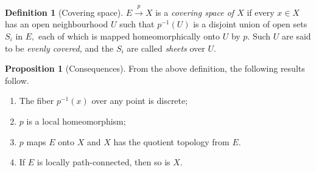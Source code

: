 \documentclass[12pt]{article}
\theoremstyle{definition}
\numberwithin{thm}{section}
\newtheorem{defn}[thm]{Definition}
\newtheorem{prop}[thm]{Proposition}
\begin{document}
\begin{defn}[Covering space]
	$E \overset{p}{\longrightarrow} X$ is a \emph{covering space of $X$} if every $x \in X$ has an open neighbourhood $U$ such that $p^{-1}(U)$ is a disjoint union of open sets $S_i$ in $E,$ each of which is mapped homeomorphically onto $U$ by $p.$ Such $U$ are said to be \emph{evenly covered,} and the $S_i$ are called \emph{sheets} over $U.$
\end{defn}
\begin{prop}[Consequences]
	From the above definition, the following results follow.
	\begin{enumerate}
		\item The fiber $p^{-1}(x)$ over any point is discrete;
		\item $p$ is a local homeomorphism;
		\item $p$ maps $E$ onto $X$ and $X$ has the quotient topology from $E.$
		\item If $E$ is locally path-connected, then so is $X.$
	\end{enumerate}
\end{prop}
\end{document}
